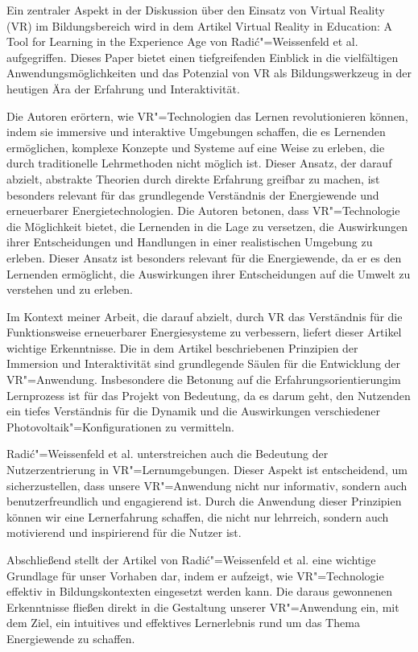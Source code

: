 \documentclass[draft]{vutinfth} %
\begin{document}
Ein zentraler Aspekt in der Diskussion über den Einsatz von Virtual Reality (VR) im Bildungsbereich wird in dem Artikel \glqq Virtual Reality in Education: A Tool for Learning in the Experience Age\grqq\cite{hu2017virtual} von Radić"=Weissenfeld et al. aufgegriffen. Dieses Paper bietet einen tiefgreifenden Einblick in die vielfältigen Anwendungsmöglichkeiten und das Potenzial von VR als Bildungswerkzeug in der heutigen Ära der Erfahrung und Interaktivität.

Die Autoren erörtern, wie VR"=Technologien das Lernen revolutionieren können, indem sie immersive und interaktive Umgebungen schaffen, die es Lernenden ermöglichen, komplexe Konzepte und Systeme auf eine Weise zu erleben, die durch traditionelle Lehrmethoden nicht möglich ist. Dieser Ansatz, der darauf abzielt, abstrakte Theorien durch direkte Erfahrung greifbar zu machen, ist besonders relevant für das grundlegende Verständnis der Energiewende und erneuerbarer Energietechnologien. Die Autoren betonen, dass VR"=Technologie die Möglichkeit bietet, die Lernenden in die Lage zu versetzen, die Auswirkungen ihrer Entscheidungen und Handlungen in einer realistischen Umgebung zu erleben. Dieser Ansatz ist besonders relevant für die Energiewende, da er es den Lernenden ermöglicht, die Auswirkungen ihrer Entscheidungen auf die Umwelt zu verstehen und zu erleben.

Im Kontext meiner Arbeit, die darauf abzielt, durch VR das Verständnis für die Funktionsweise erneuerbarer Energiesysteme zu verbessern, liefert dieser Artikel wichtige Erkenntnisse. Die in dem Artikel beschriebenen Prinzipien der Immersion und Interaktivität sind grundlegende Säulen für die Entwicklung der VR"=Anwendung. Insbesondere die Betonung auf die \glqq Erfahrungsorientierung\grqq im Lernprozess ist für das Projekt von Bedeutung, da es darum geht, den Nutzenden ein tiefes Verständnis für die Dynamik und die Auswirkungen verschiedener Photovoltaik"=Konfigurationen zu vermitteln.

Radić"=Weissenfeld et al. unterstreichen auch die Bedeutung der Nutzerzentrierung in VR"=Lernumgebungen. Dieser Aspekt ist entscheidend, um sicherzustellen, dass unsere VR"=Anwendung nicht nur informativ, sondern auch benutzerfreundlich und engagierend ist. Durch die Anwendung dieser Prinzipien können wir eine Lernerfahrung schaffen, die nicht nur lehrreich, sondern auch motivierend und inspirierend für die Nutzer ist.

Abschließend stellt der Artikel von Radić"=Weissenfeld et al. eine wichtige Grundlage für unser Vorhaben dar, indem er aufzeigt, wie VR"=Technologie effektiv in Bildungskontexten eingesetzt werden kann. Die daraus gewonnenen Erkenntnisse fließen direkt in die Gestaltung unserer VR"=Anwendung ein, mit dem Ziel, ein intuitives und effektives Lernerlebnis rund um das Thema Energiewende zu schaffen.
\end{document}
